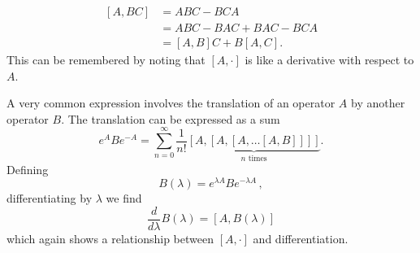 

\begin{align}
  \left[A,BC\right] &= ABC - BCA \nonumber \\
  & = ABC - BAC + BAC - BCA \nonumber \\
  & = [A,B]C + B[A,C].
\end{align}
This can be remembered by noting that $[A,\cdot]$ is like a derivative with respect to $A$.


A very common expression involves the translation of an operator $A$ by another operator $B$.
The translation can be expressed as a sum
\begin{equation}
  e^{A}Be^{-A}=\sum_{n=0}^{\infty}\frac{1}{n!}\underbrace{[A,[A,[A,\ldots[A,B]]]]}_{n\textrm{ times}}. \label{eq:translationSum}
\end{equation}
Defining
\begin{equation}
  B(\lambda) = e^{\lambda A} B e^{-\lambda A}
  \, ,
\end{equation}
differentiating by $\lambda$ we find
\begin{equation}
  \frac{d}{d\lambda}B(\lambda) = [A, B(\lambda)] \label{eq:translation_diff_eq}
\end{equation}
which again shows a relationship between $[A, \cdot]$ and differentiation.


